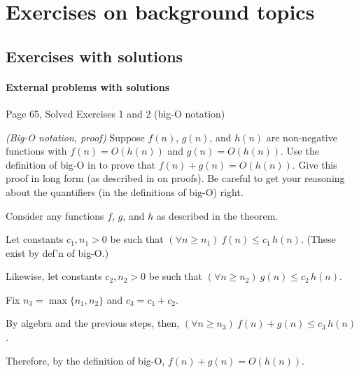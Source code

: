 \documentclass[11pt]{article}
\begin{document}

\section{Exercises on background topics}\label{prelim: sec: exercises}

\subsection{Exercises with solutions}

\paragraph{External problems with solutions}
\begin{mylist}[-]
\item \KT Page 65, Solved Exercises 1 and 2 (big-O notation)
\end{mylist}


\exercise \emph{(Big-O notation, proof)}
Suppose $f(n)$, $g(n)$, and $h(n)$ are non-negative functions with $f(n) = O(h(n))$ and $g(n) = O(h(n))$.
Use the definition of big-O in  to prove that $f(n)+g(n) = O(h(n))$.
Give this proof in long form (as described in  on proofs).
Be careful to get your reasoning about the quantifiers (in the definitions of big-O) right.

\solution

\begin{longFormProof}

  \step Consider any functions $f$, $g$, and $h$ as described in the theorem.

  \step Let constants $c_1, n_1>0$ be such that
  $(\forall n \ge n_1)~ f(n) \le c_1\, h(n)$.  (These exist by def'n of big-O.)
  
  \step Likewise, let constants $c_2, n_2>0$ be such that
  $(\forall n \ge n_2)~ g(n) \le c_2\, h(n)$.

  \step Fix $n_3 = \max\{n_1, n_2\}$ and $c_3 = c_1 + c_2$.

  \step By algebra and the previous steps, then, $(\forall n \ge n_3)~ f(n) + g(n) \le c_3 \,h(n)$.

  \step Therefore, by the definition of big-O, $f(n) + g(n) = O(h(n))$. 
  
\end{longFormProof}
\end{document}
